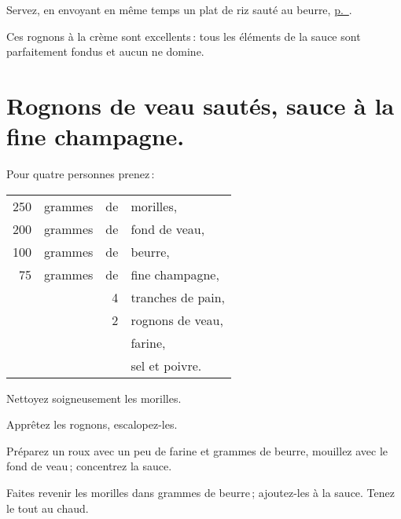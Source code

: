 Servez, en envoyant en même temps un plat de riz sauté au beurre,
\hyperlink{p0710}{p. \pageref{pg0710}}.

Ces rognons à la crème sont excellents : tous les éléments de la sauce sont
parfaitement fondus et aucun ne domine.

\section*{\centering Rognons de veau sautés, sauce à la fine champagne.}
{}

Pour quatre personnes prenez :

\medskip

\footnotesize
\begin{longtable}{rrrp{18em}}
    250 & grammes & de & morilles,                                                                        \\
    200 & grammes & de & fond de veau,                                                                    \\
    100 & grammes & de & beurre,                                                                          \\
     75 & grammes & de & fine champagne,                                                                  \\
        &         &  4 & tranches de pain,                                                                \\
        &         &  2 & rognons de veau,                                                                 \\
        &         &    & farine,                                                                          \\
        &         &    & sel et poivre.                                                                   \\
\end{longtable}
\normalsize


Nettoyez soigneusement les morilles.

Apprêtez les rognons, escalopez-les.

Préparez un roux avec un peu de farine et {\mmm} grammes de beurre,
mouillez avec le fond de veau ; concentrez la sauce.

Faites revenir les morilles dans {\mmm} grammes de beurre ; ajoutez-les
à la sauce. Tenez le tout au chaud.

